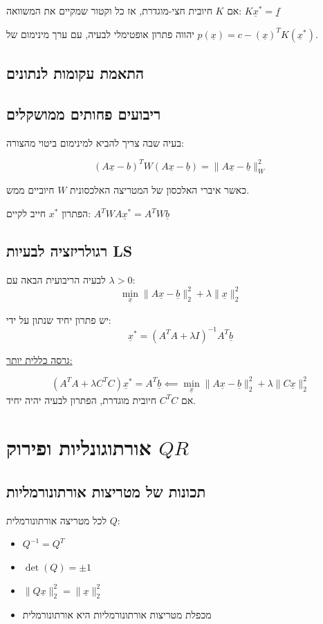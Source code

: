 \documentclass[11pt]{article}
\begin{document}
אם \(K\) חיובית חצי-מוגדרת, אז כל וקטור שמקיים את המשוואה:
\(K\underline{x}^{*} = \underline{f}\)

יהווה פתרון אופטימלי לבעיה, עם ערך מינימום של \(p \left( \underline{x} \right) = c - \left( \underline{x} \right)^TK \left( \underline{x}^{*} \right)\).

\subsection{התאמת עקומות לנתונים}
\label{sec:orgfc00ddb}
\subsection{ריבועים פחותים ממושקלים}
\label{sec:orgeb8e6d1}
בעיה שבה צריך להביא למינימום ביטוי מהצורה:

$$\left( A\underline{x} - b \right)^T W \left( A\underline{x} - \underline{b} \right)
=
\|A\underline{x}-\underline{b}\|_W^2$$

כאשר איברי האלכסון של המטריצה האלכסונית \(W\) חיוביים ממש.

הפתרון \(x^{*}\) חייב לקיים: \(A^TWA\underline{x}^{*} = A^TW\underline{b}\)

\subsection{רגולריזציה לבעיות LS}
\label{sec:orgdf75198}
לבעיה הריבועית הבאה עם  \(\lambda>0\):
\[
\min_{\underline{x}} \|A\underline{x}-\underline{b}\|_2^2 + \lambda \|\underline{x}\|^2_2
\]

יש פתרון יחיד שנתון על ידי:
\[
\underline{x}^{*} = \left( A^TA + \lambda I \right)^{-1} A^T\underline{b}
\]

\uline{גרסה כללית יותר:}

\[
\left( A^TA + \lambda C^TC \right)\underline{x}^{*} = A^T\underline{b}
\impliedby
\min_{\underline{x}} \|A\underline{x}-\underline{b}\|_2^2 + \lambda \|C\underline{x}\|_2^2
\]
אם \(C^TC\) חיובית מוגדרת, הפתרון לבעיה יהיה יחיד.



\section{אורתוגונליות ופירוק \(QR\)}
\label{sec:org3e65c94}
\subsection{תכונות של מטריצות אורתונורמליות}
\label{sec:org2f4bf82}
לכל מטריצה אורתונורמלית \(Q\):
\begin{itemize}
\item \(Q^{-1} = Q^T\)
\item \(\det \left( Q \right) = \pm 1\)
\item \(\|Q \underline{x}\|_2^2 = \|\underline{x}\|_2^2\)
\item מכפלת מטריצות אורתונורמליות היא אורתונורמלית
\end{itemize}
\end{document}
